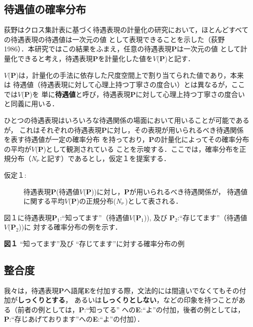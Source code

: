 \subsection{待遇値の確率分布}
荻野はクロス集計表に基づく待遇表現の計量化の研究において，ほとんどすべての待遇表現の待遇値は一次元の値
として表現できることを示した（荻野 1986）．本研究ではこの結果をふまえ，任意の待遇表現{\bf P}は一次元の値
として計量化できると考え，待遇表現{\bf P}を計量化した値を\(V\)({\bf P})と記す．

\(V\)({\bf P})は，計量化の手法に依存した尺度空間上で割り当てられた値であり，本来は
待遇値（待遇表現に対して心理上持つ丁寧さの度合い）とは異なるが，ここでは\(V\)({\bf P})を
単に{\bf 待遇値}と呼び，待遇表現{\bf P}に対して心理上持つ丁寧さの度合いと同義に用いる．

ひとつの待遇表現はいろいろな待遇関係の場面において用いることが可能であるが，
これはそれぞれの待遇表現{\bf P}に対し，その表現が用いられるべき待遇関係を表す待遇値が一定の確率分布
を持っており，{\bf P}の計量化によってその確率分布の平均が\(V\)({\bf P})として観測されている
ことを示唆する．ここでは，確率分布を正規分布（{\em N}\(_{\mbox{\tiny{P}}}\)と記す）であるとし，仮定１を提案する．

\medskip

\begin{description}
\item[仮定１:]待遇表現{\bf P}(待遇値\(V\)({\bf P}))に対し，{\bf P}が用いられるべき待遇関係が，
待遇値に関する平均\(V\)({\bf P})の正規分布({\em N}\(_{\mbox{\tiny{P}}}\))として表される．
\end{description}

\medskip

図１に待遇表現{\bf P}\(_{1}\):“知ってます”（待遇値\(V\)({\bf P}\(_{1}\))),
及び {\bf P}\(_{2}\):``存じてます”（待遇値\(V\)({\bf P}\(_{2}\)))に
対する確率分布の例を示す．
\begin{center}

{\bf 図１} “知ってます”及び ``存じてます”に対する確率分布の例
\end{center}
\subsection{整合度}
我々は，待遇表現{\bf P}へ語尾{\bf E}を付加する際，文法的には間違いでなくてもその付加が{\bf しっくりとする}，
あるいは{\bf しっくりとしない}，などの印象を持つことがある（前者の例としては，{\bf P}:``知ってる''
への{\bf E}:``よ''の付加，後者の例としては，{\bf P}:``存じあげております''への{\bf E}:``よ''の付加）．

